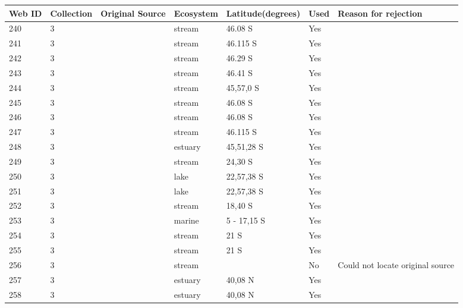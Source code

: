 \documentclass[12pt]{article}
\begin{document}
\begin{landscape}
    \begin{table}[h!]
    \centering
    {\footnotesize
      \begin{tabular}{p{2.8cm}p{1.3cm}p{5.5cm}p{2.2cm}p{2.5cm}lp{3.5cm}}
        \hline
        Web ID & Collection & Original Source & Ecosystem & Latitude(degrees) & Used  & Reason for rejection  \\
        \hline
        240   & 3 & \citet{Thompson2004c}  & stream & 46.08 S & Yes   &       \\
        241   & 3 & \citet{Thompson2004c}  & stream & 46.115 S & Yes   &       \\
        242   & 3 & \citet{Thompson2004c}  & stream & 46.29 S & Yes   &       \\
        243   & 3 & \citet{Thompson2004c}  & stream & 46.41 S & Yes   &       \\
        244   & 3 & \citet{Thompson2004c}  & stream & 45,57,0 S & Yes   &       \\
        245   & 3 & \citet{Thompson2004c}  & stream & 46.08 S & Yes   &       \\
        246   & 3 & \citet{Thompson2004c}  & stream & 46.08 S & Yes   &       \\
        247   & 3 & \citet{Thompson2004c}  & stream & 46.115 S & Yes   &       \\
        248   & 3 & \citet{Thompson2004}  & estuary & 45,51,28 S & Yes   &        \\
        249   & 3 & \citet{Angelini2005}  & stream & 24,30 S & Yes   &       \\
        250   & 3 & \citet{Angelini2006}  & lake  & 22,57,38 S & Yes   &       \\
        251   & 3 & \citet{Angelini2006}  & lake  & 22,57,38 S & Yes   &       \\
        252   & 3 & \citet{Angelini2010}  & stream & 18,40 S & Yes   &       \\
        253   & 3 & \citet{Angelini2011}  & marine & 5 - 17,15 S & Yes   &       \\
        254   & 3 & \citet{Angelini2013}  & stream & 21 S  & Yes   &       \\
        255   & 3 & \citet{Angelini2013}  & stream & 21 S  & Yes   &       \\
        256   & 3 & \citet{Angelini2013}  & stream &       & No    & Could not locate original source \\
        257   & 3 & \citet{Baeta2011}  & estuary & 40,08 N & Yes   &       \\
        258   & 3 & \citet{Baeta2011}  & estuary & 40,08 N & Yes   &       \\

\end{tabular}}
\end{table}
\end{landscape}
\end{document}
